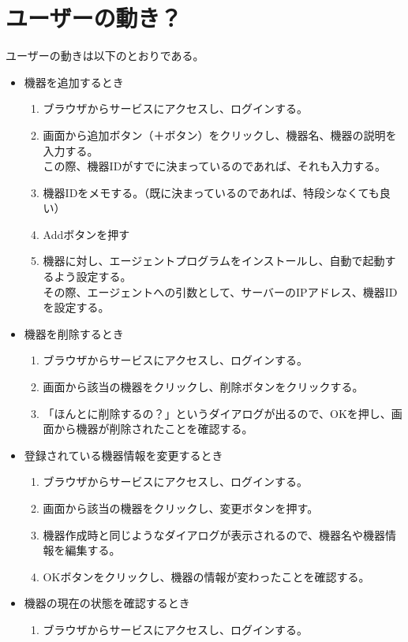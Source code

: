 \section{ユーザーの動き？}
ユーザーの動きは以下のとおりである。
\begin{itemize}
\item 機器を追加するとき
	\begin{enumerate}
		\item ブラウザからサービスにアクセスし、ログインする。
		\item 画面から追加ボタン（＋ボタン）をクリックし、機器名、機器の説明を入力する。\\
			この際、機器IDがすでに決まっているのであれば、それも入力する。
		\item 機器IDをメモする。（既に決まっているのであれば、特段シなくても良い）
		\item Addボタンを押す
		\item 機器に対し、エージェントプログラムをインストールし、自動で起動するよう設定する。\\
			その際、エージェントへの引数として、サーバーのIPアドレス、機器IDを設定する。
	\end{enumerate}
\item 機器を削除するとき
	\begin{enumerate}
		\item ブラウザからサービスにアクセスし、ログインする。
		\item 画面から該当の機器をクリックし、削除ボタンをクリックする。
		\item 「ほんとに削除するの？」というダイアログが出るので、OKを押し、画面から機器が削除されたことを確認する。
	\end{enumerate}
\item 登録されている機器情報を変更するとき
	\begin{enumerate}
		\item ブラウザからサービスにアクセスし、ログインする。
		\item 画面から該当の機器をクリックし、変更ボタンを押す。
		\item 機器作成時と同じようなダイアログが表示されるので、機器名や機器情報を編集する。
		\item OKボタンをクリックし、機器の情報が変わったことを確認する。
	\end{enumerate}
\item 機器の現在の状態を確認するとき
	\begin{enumerate}
		\item ブラウザからサービスにアクセスし、ログインする。

\end{enumerate}
\end{itemize}
